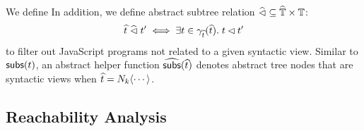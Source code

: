 % 
% 
% 
% 
% 
% 
% 
% 
We define
In addition, we define abstract subtree relation $\widehat{\lhd} \subseteq \widehat{\mathbb{T}}
\times \mathbb{T}$:
\[
  \widehat{t} \; \widehat{\lhd} \; t' \iff \exists t \in \gamma_{\widehat{t}}(\widehat{t}). \;
  t \lhd t'
\]
to filter out JavaScript programs not related to a given syntactic view.
Similar to $\getsubs(\tree)$, an abstract helper function $\agetsubs(\atree)$
denotes abstract tree nodes that are syntactic views when $\widehat{t} = N_k
\langle \cdots \rangle$.

\subsection{Reachability Analysis}\label{sec:view}

\todo
